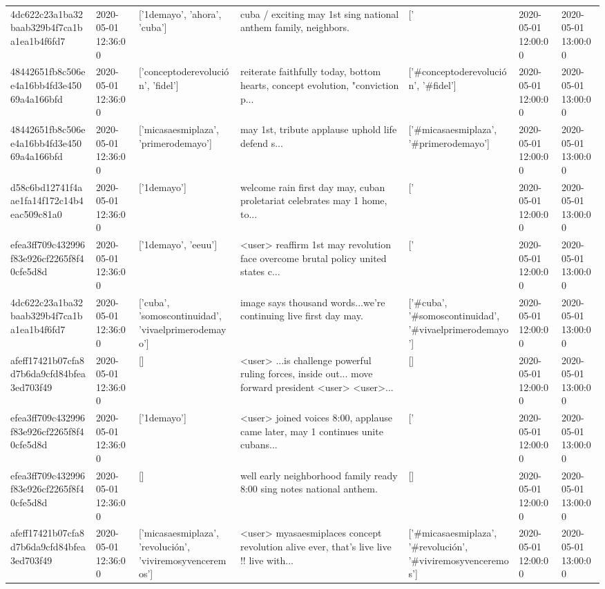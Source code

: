 \begin{tabular}{lllllll}
4dc622c23a1ba32baab329b4f7ca1ba1ea1b4f6fd7 & 2020-05-01 12:36:00 & ['1demayo', 'ahora', 'cuba'] & cuba / exciting may 1st sing national anthem family, neighbors. & ['#1demayo', '#ahora', '#cuba'] & 2020-05-01 12:00:00 & 2020-05-01 13:00:00 \\
48442651fb8c506ee4a16bb4fd3e45069a4a166bfd & 2020-05-01 12:36:00 & ['conceptoderevolución', 'fidel'] & reiterate faithfully today, bottom hearts, concept evolution, "conviction p... & ['#conceptoderevolución', '#fidel'] & 2020-05-01 12:00:00 & 2020-05-01 13:00:00 \\
48442651fb8c506ee4a16bb4fd3e45069a4a166bfd & 2020-05-01 12:36:00 & ['micasaesmiplaza', 'primerodemayo'] & may 1st, tribute applause uphold life defend s... & ['#micasaesmiplaza', '#primerodemayo'] & 2020-05-01 12:00:00 & 2020-05-01 13:00:00 \\
d58c6bd12741f4aae1fa14f172c14b4eac509c81a0 & 2020-05-01 12:36:00 & ['1demayo'] & welcome rain first day may, cuban proletariat celebrates may 1 home, to... & ['#1demayo'] & 2020-05-01 12:00:00 & 2020-05-01 13:00:00 \\
efea3ff709c432996f83e926cf2265f8f40cfe5d8d & 2020-05-01 12:36:00 & ['1demayo', 'eeuu'] & <user> reaffirm 1st may revolution face overcome brutal policy united states c... & ['#1demayo', '#eeuu'] & 2020-05-01 12:00:00 & 2020-05-01 13:00:00 \\
4dc622c23a1ba32baab329b4f7ca1ba1ea1b4f6fd7 & 2020-05-01 12:36:00 & ['cuba', 'somoscontinuidad', 'vivaelprimerodemayo'] & image says thousand words...we're continuing live first day may. & ['#cuba', '#somoscontinuidad', '#vivaelprimerodemayo'] & 2020-05-01 12:00:00 & 2020-05-01 13:00:00 \\
afeff17421b07cfa8d7b6da9cfd84bfea3ed703f49 & 2020-05-01 12:36:00 & [] & <user> ...is challenge powerful ruling forces, inside out... move forward president <user> <user>... & [] & 2020-05-01 12:00:00 & 2020-05-01 13:00:00 \\
efea3ff709c432996f83e926cf2265f8f40cfe5d8d & 2020-05-01 12:36:00 & ['1demayo'] & <user> joined voices 8:00, applause came later, may 1 continues unite cubans... & ['#1demayo'] & 2020-05-01 12:00:00 & 2020-05-01 13:00:00 \\
efea3ff709c432996f83e926cf2265f8f40cfe5d8d & 2020-05-01 12:36:00 & [] & well early neighborhood family ready 8:00 sing notes national anthem. & [] & 2020-05-01 12:00:00 & 2020-05-01 13:00:00 \\
afeff17421b07cfa8d7b6da9cfd84bfea3ed703f49 & 2020-05-01 12:36:00 & ['micasaesmiplaza', 'revolución', 'viviremosyvenceremos'] & <user> myasaesmiplaces concept revolution alive ever, that's live live !!️ live with... & ['#micasaesmiplaza', '#revolución', '#viviremosyvenceremos'] & 2020-05-01 12:00:00 & 2020-05-01 13:00:00 \\

\end{tabular}
